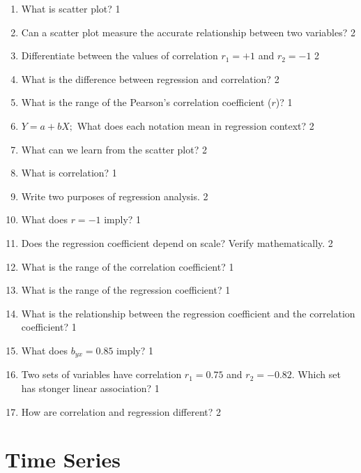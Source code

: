 \documentclass[a4paper,oneside]{book}
\begin{document}
  \begin{enumerate}
  \item What is scatter plot? \hfill 1
  \item Can a scatter plot measure the accurate relationship between two variables? \hfill 2
  \item Differentiate between the values of correlation $r_1 = +1$ and $r_2=-1$ \hfill 2
  \item What is the difference between regression and correlation? \hfill 2
  \item What is the range of the Pearson's correlation coefficient ($r$)? \hfill 1
  \item $Y= a +bX;$ What does each notation mean in regression context? \hfill 2
  \item What can we learn from the scatter plot? \hfill 2
  \item What is correlation? \hfill 1
  \item Write two purposes of regression analysis. \hfill 2
  \item What does $r=-1$ imply? \hfill 1
  \item Does the regression coefficient depend on scale? Verify mathematically. \hfill 2
  \item What is the range of the correlation coefficient?  \hfill 1
  \item What is the range of the regression coefficient? \hfill 1
  \item What is the relationship between the regression coefficient and the correlation coefficient? \hfill 1
  \item What does $b_{yx} = 0.85$ imply? \hfill 1
  \item Two sets of variables have correlation $r_1 = 0.75$ and $r_2 = -0.82$. Which set has stonger linear association? \hfill 1
  \item How are correlation and regression different? \hfill 2
  \end{enumerate}

\chapter{Time Series} 
\end{document}
